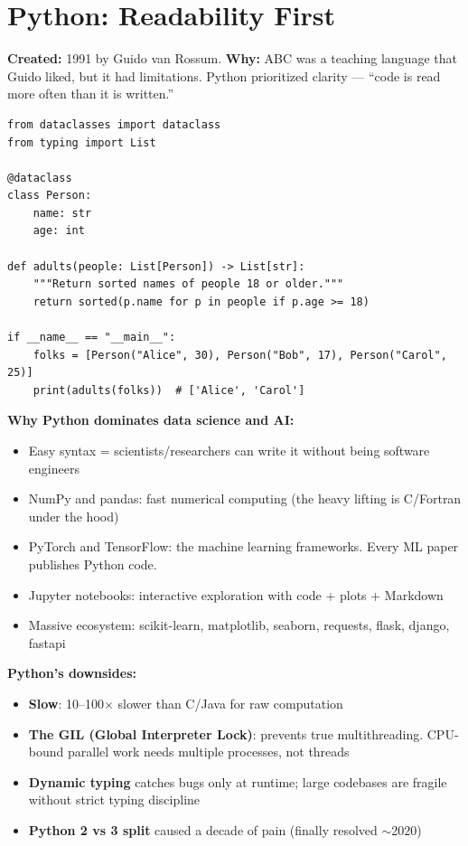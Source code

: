 \documentclass[11pt, letterpaper]{article}
\begin{document}
\vspace{8pt}

\section*{Python: Readability First}

\textbf{Created:} 1991 by Guido van Rossum. \textbf{Why:} ABC was a teaching language that Guido liked, but it had limitations. Python prioritized clarity --- ``code is read more often than it is written.''

\begin{lstlisting}[style=code, caption={Python: typical script}]
from dataclasses import dataclass
from typing import List

@dataclass
class Person:
    name: str
    age: int

def adults(people: List[Person]) -> List[str]:
    """Return sorted names of people 18 or older."""
    return sorted(p.name for p in people if p.age >= 18)

if __name__ == "__main__":
    folks = [Person("Alice", 30), Person("Bob", 17), Person("Carol", 25)]
    print(adults(folks))  # ['Alice', 'Carol']
\end{lstlisting}

\textbf{Why Python dominates data science and AI:}
\begin{itemize}[noitemsep]
  \item Easy syntax = scientists/researchers can write it without being software engineers
  \item NumPy and pandas: fast numerical computing (the heavy lifting is C/Fortran under the hood)
  \item PyTorch and TensorFlow: the machine learning frameworks. Every ML paper publishes Python code.
  \item Jupyter notebooks: interactive exploration with code + plots + Markdown
  \item Massive ecosystem: scikit-learn, matplotlib, seaborn, requests, flask, django, fastapi
\end{itemize}

\textbf{Python's downsides:}
\begin{itemize}[noitemsep]
  \item \textbf{Slow}: 10--100$\times$ slower than C/Java for raw computation
  \item \textbf{The GIL (Global Interpreter Lock)}: prevents true multithreading. CPU-bound parallel work needs multiple processes, not threads
  \item \textbf{Dynamic typing} catches bugs only at runtime; large codebases are fragile without strict typing discipline
  \item \textbf{Python 2 vs 3 split} caused a decade of pain (finally resolved $\sim$2020)
\end{itemize}
\end{document}
